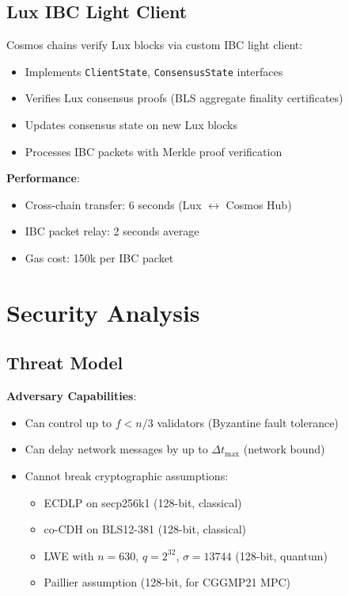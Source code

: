 \documentclass[11pt]{article}
\begin{document}
\subsection{Lux IBC Light Client}

Cosmos chains verify Lux blocks via custom IBC light client:
\begin{itemize}[leftmargin=1.1em]
  \item Implements \texttt{ClientState}, \texttt{ConsensusState} interfaces
  \item Verifies Lux consensus proofs (BLS aggregate finality certificates)
  \item Updates consensus state on new Lux blocks
  \item Processes IBC packets with Merkle proof verification
\end{itemize}

\textbf{Performance}:
\begin{itemize}[leftmargin=1.1em]
  \item Cross-chain transfer: 6 seconds (Lux $\leftrightarrow$ Cosmos Hub)
  \item IBC packet relay: 2 seconds average
  \item Gas cost: 150k per IBC packet
\end{itemize}

\section{Security Analysis}

\subsection{Threat Model}

\textbf{Adversary Capabilities}:
\begin{itemize}[leftmargin=1.1em]
  \item Can control up to $f < n/3$ validators (Byzantine fault tolerance)
  \item Can delay network messages by up to $\Delta t_{\text{max}}$ (network bound)
  \item Cannot break cryptographic assumptions:
  \begin{itemize}
    \item ECDLP on secp256k1 (128-bit, classical)
    \item co-CDH on BLS12-381 (128-bit, classical)
    \item LWE with $n = 630$, $q = 2^{32}$, $\sigma = 13744$ (128-bit, quantum)
    \item Paillier assumption (128-bit, for CGGMP21 MPC)
  \end{itemize}
\end{itemize}
\end{document}
